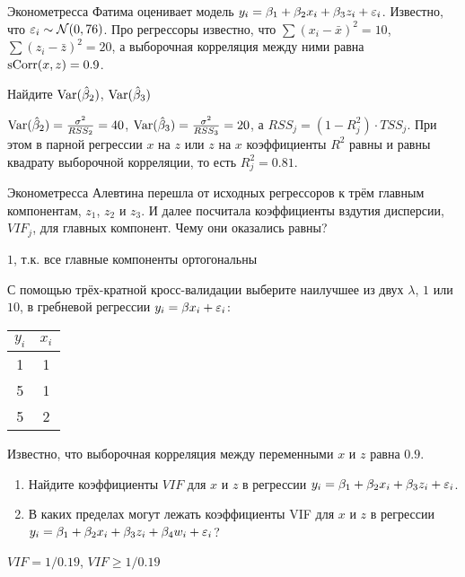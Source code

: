 \begin{problem}
Эконометресса Фатима оценивает модель $y_i=\beta_1 +\beta_2 x_i + \beta_3 z_i + \varepsilon_i$. Известно, что $\varepsilon_i \sim \mathcal{N}(0,76)$. Про регрессоры известно, что $\sum (x_i-\bar{x})^2=10$, $\sum (z_i-\bar{z})^2=20$, а выборочная корреляция между ними равна $\operatorname{sCorr}(x,z)=0.9$.

Найдите $\operatorname{Var}(\hat{\beta}_2)$, $\operatorname{Var}(\hat{\beta}_3)$


\begin{sol}
$\operatorname{Var}(\hat{\beta}_2)=\frac{\sigma^2}{RSS_2}=40$, $\operatorname{Var}(\hat{\beta}_3)=\frac{\sigma^2}{RSS_3}=20$, а $RSS_j=(1-R^2_j) \cdot TSS_j$. При этом в парной регрессии $x$ на $z$ или $z$ на $x$ коэффициенты $R^2$ равны и равны квадрату выборочной корреляции, то есть $R^2_j=0.81$.
\end{sol}
\end{problem}


\begin{problem}
Эконометресса Алевтина перешла от исходных регрессоров к трём главным компонентам, $z_1$, $z_2$ и $z_3$. И далее посчитала коэффициенты вздутия дисперсии, $VIF_j$, для главных компонент. Чему они оказались равны?


\begin{sol}
$1$, т.к. все главные компоненты ортогональны
\end{sol}
\end{problem}



\begin{problem}
С помощью трёх-кратной кросс-валидации выберите наилучшее из двух $\lambda$, $1$ или $10$, в гребневой регрессии $y_i=\beta x_i + \varepsilon_i$:
\begin{tabular}{cc}
\toprule
$y_i$ & $x_i$ \\
\midrule
1 & 1 \\
5 & 1 \\
5 & 2 \\
\bottomrule
\end{tabular}


\begin{sol}

\end{sol}
\end{problem}



\begin{problem}
Известно, что выборочная корреляция между переменными $x$ и $z$ равна $0.9$.
\begin{enumerate}
\item Найдите коэффициенты $VIF$ для $x$ и $z$ в регрессии $y_i=\beta_1 + \beta_2 x_i + \beta_3 z_i + \varepsilon_i$.
\item В каких пределах могут лежать коэффициенты VIF для $x$ и $z$ в регрессии $y_i=\beta_1 + \beta_2 x_i + \beta_3 z_i + \beta_4 w_i + \varepsilon_i$?
\end{enumerate}


\begin{sol}
$VIF=1/0.19$, $VIF\geq 1/0.19$
\end{sol}
\end{problem}


